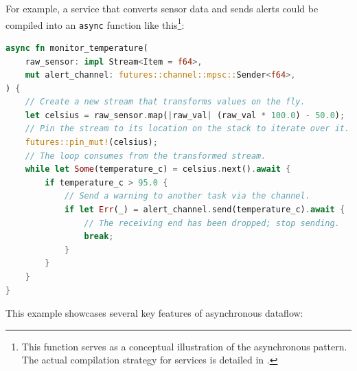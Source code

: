 For example, a service that converts sensor data and sends alerts could be compiled into an
\texttt{async} function like this\footnote{This function serves as a conceptual illustration of the
    asynchronous pattern. The actual compilation strategy for services is detailed in
    .}:
\begin{lstlisting}[language=Rust]
async fn monitor_temperature(
    raw_sensor: impl Stream<Item = f64>,
    mut alert_channel: futures::channel::mpsc::Sender<f64>,
) {
    // Create a new stream that transforms values on the fly.
    let celsius = raw_sensor.map(|raw_val| (raw_val * 100.0) - 50.0);
    // Pin the stream to its location on the stack to iterate over it.
    futures::pin_mut!(celsius);
    // The loop consumes from the transformed stream.
    while let Some(temperature_c) = celsius.next().await {
        if temperature_c > 95.0 {
            // Send a warning to another task via the channel.
            if let Err(_) = alert_channel.send(temperature_c).await {
                // The receiving end has been dropped; stop sending.
                break;
            }
        }
    }
}
\end{lstlisting}
This example showcases several key features of asynchronous dataflow:
